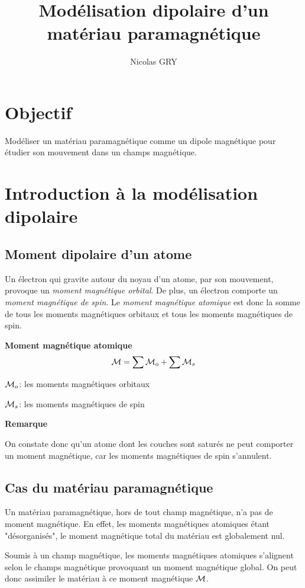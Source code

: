 \documentclass{article}
\author{Nicolas GRY}
\title{Modélisation dipolaire d'un matériau paramagnétique}
\begin{document}
\maketitle
\section{Objectif}
Modéliser un matériau paramagnétique comme un dipole magnétique pour étudier son mouvement dans un champs magnétique.

\section{Introduction à la modélisation dipolaire}
\subsection{Moment dipolaire d'un atome}
Un électron qui gravite autour du noyau d'un atome, par son mouvement, provoque un \emph{moment magnétique orbital}. De plus, un électron comporte un \emph{moment magnétique de spin}. Le \emph{moment magnétique atomique} est donc la somme de tous les moments magnétiques orbitaux et tous les moments magnétiques de spin.

\textbf{Moment magnétique atomique}
\large
$$\mathcal{M} = \displaystyle \sum \mathcal{M}_{o} + \sum \mathcal{M}_{s}$$ 
\small 

\textbf{$\mathcal{M}_{o}$}: les moments magnétiques orbitaux

\textbf{$\mathcal{M}_{s}$}: les moments magnétiques de spin

\normalsize

\textbf{Remarque}

On constate donc qu'un atome dont les couches sont saturés ne peut comporter un moment magnétique, car les moments magnétiques de spin s'annulent.

\subsection{Cas du matériau paramagnétique}
Un matériau paramagnétique, hors de tout champ magnétique, n'a pas de moment magnétique. En effet, les moments magnétiques atomiques étant "désorganisés", le moment magnétique total du matériau est globalement nul.

Soumis à un champ magnétique, les moments magnétiques atomiques s'alignent selon le champs magnétique provoquant un moment magnétique global. On peut donc assimiler le matériau à ce moment magnétique $\mathcal{M}$.
\end{document}
